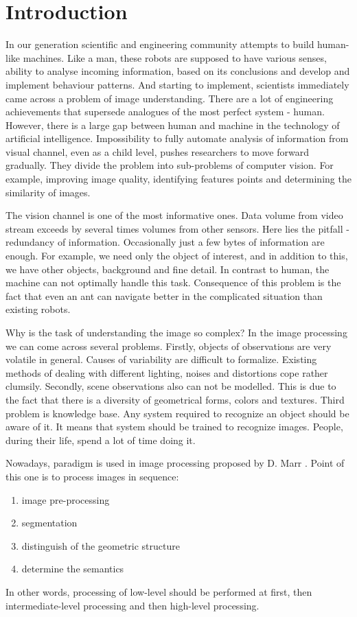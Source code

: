 \documentclass[12pt,a4paper,oneside,titlepage]{article}
\begin{document}
\section*{Introduction}
In our generation scientific and engineering community attempts to build human-like machines.
Like a man, these robots are supposed to have various senses, ability to analyse incoming information, based on its conclusions and develop and implement behaviour patterns.
And starting to implement, scientists immediately came across a problem of image understanding.
There are a lot of engineering achievements that supersede analogues of the most perfect system - human.
However, there is a large gap between human and machine in the technology of artificial intelligence.
Impossibility to fully automate analysis of information from visual channel, even as a child level, pushes researchers to move forward gradually.
They divide the problem into sub-problems of computer vision. 
For example, improving image quality, identifying features points and determining the similarity of images.

The vision channel is one of the most informative ones.
Data volume from video stream exceeds by several times volumes from other sensors.
Here lies the pitfall - redundancy of information.
Occasionally just a few bytes of information are enough.
For example, we need only the object of interest, and in addition to this, we have other objects, background and fine detail.
In contrast to human, the machine can not optimally handle this task.
Consequence of this problem is the fact that even an ant can navigate better in the complicated situation than existing robots.

Why is the task of understanding the image so complex?
In the image processing we can come across several problems.
Firstly, objects of observations are very volatile in general.
Causes of variability are difficult to formalize.
Existing methods of dealing with different lighting, noises and distortions cope rather clumsily.
Secondly, scene observations also can not be modelled.
This is due to the fact that there is a diversity of geometrical forms, colors and textures.
Third problem is knowledge base.
Any system required to recognize an object should be aware of it.
It means that system should be trained to recognize images.
People, during their life, spend a lot of time doing it.

Nowadays, paradigm is used in image processing proposed by D. Marr \cite{marr}.
Point of this one is to process images in sequence:
\begin{enumerate}
  \item image pre-processing
  \item segmentation
  \item distinguish of the geometric structure
  \item determine the semantics
\end{enumerate}
In other words, processing of low-level should be performed at first, then intermediate-level processing and then high-level processing.
\end{document}
